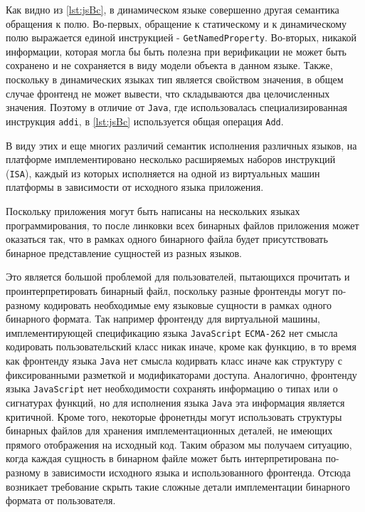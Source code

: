 Как видно из \autoref{lst:jsBc}, в динамическом языке совершенно другая семантика обращения к полю. Во-первых, обращение к статическому и к динамическому полю выражается единой инструкцией - \texttt{GetNamedProperty}. Во-вторых, никакой информации, которая могла бы быть полезна при верификации не может быть сохранено и не сохраняется в виду модели объекта в данном языке. Также, поскольку в динамических языках тип является свойством значения, в общем случае фронтенд не может вывести, что складываются два целочисленных значения. Поэтому в отличие от \texttt{Java}, где использовалась специализированная инструкция \texttt{addi}, в \autoref{lst:jsBc} используется общая операция \texttt{Add}.

В виду этих и еще многих различий семантик исполнения различных языков, на платформе имплементировано несколько расширяемых наборов инструкций (\texttt{ISA}), каждый из которых исполняется на одной из виртуальных машин платформы в зависимости от исходного языка приложения.

Поскольку приложения могут быть написаны на нескольких языках программирования, то после линковки всех бинарных файлов приложения может оказаться так, что в рамках одного бинарного файла будет присутствовать бинарное представление сущностей из разных языков.

Это является большой проблемой для пользователей, пытающихся прочитать и проинтерпретировать бинарный файл, поскольку разные фронтенды могут по-разному кодировать необходимые ему языковые сущности в рамках одного бинарного формата. Так например фронтенду для виртуальной машины, имплементирующей спецификацию языка \texttt{JavaScript} \texttt{ECMA-262} нет смысла кодировать пользовательский класс никак иначе, кроме как функцию, в то время как фронтенду языка \texttt{Java} нет смысла кодирвать класс иначе как структуру с фиксированными разметкой и модификаторами доступа. Аналогично, фронтенду языка \texttt{JavaScript} нет необходимости сохранять информацию о типах или о сигнатурах функций, но для исполнения языка \texttt{Java} эта информация является критичной. Кроме того, некоторые фронетнды могут использовать структуры бинарных файлов для хранения имплементационных деталей, не имеющих прямого отображения на исходный код. Таким образом мы получаем ситуацию, когда каждая сущность в бинарном файле может быть интерпретирована по-разному в зависимости исходного языка и использованного фронтенда. Отсюда возникает требование скрыть такие сложные детали имплементации бинарного формата от пользователя.

